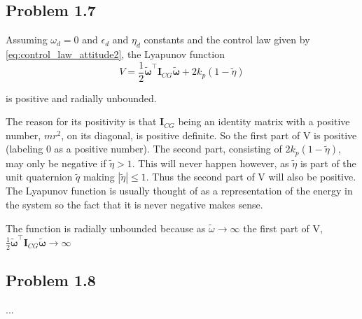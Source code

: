 \subsection*{Problem 1.7}
Assuming $\omega_d = 0$ and $\epsilon_d$ and $\eta_d$ constants and the control law given by \eqref{eq:control_law_attitude2}, the Lyapunov function 
 \begin{equation}
	 V = \frac{1}{2} \tilde{\boldsymbol{\omega}}^{\top} \mathbf{I}_{CG}\tilde{\boldsymbol{\omega}} + 2 k_p (1-\tilde{\eta})
 \end{equation}
 
is positive and radially unbounded. 

The reason for its positivity is that $\mathbf{I}_{CG}$ being an identity matrix with a positive number, $mr^2$, on its diagonal, is positive definite. So the first part of V is positive (labeling 0 as a positive number). The second part, consisting of $2 k_p (1-\tilde{\eta})$, may only be negative if $\tilde{\eta} > 1$. This will never happen however, as $\tilde{\eta}$ is part of the unit quaternion $\tilde{q}$ making $|\tilde{\eta}| \leq 1$. Thus the second part of V will also be positive. The Lyapunov function is usually thought of as a representation of the energy in the system so the fact that it is never negative makes sense. 

The function is radially unbounded because as $\tilde{\omega}\rightarrow \infty$ the first part of V, $\frac{1}{2} \tilde{\boldsymbol{\omega}}^{\top} \mathbf{I}_{CG}\tilde{\boldsymbol{\omega}} \rightarrow \infty$

\subsection*{Problem 1.8}
...


